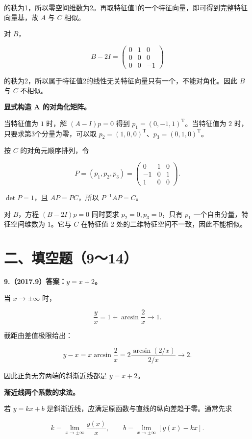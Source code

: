 \documentclass[UTF8,11pt,fontset=windows]{ctexart}
\begin{document}
的秩为1，所以零空间维数为2。再取特征值1的一个特征向量，即可得到完整特征向量基，故 $A$ 与 $C$ 相似。

对 $B$，

$$
B-2I=\begin{pmatrix}0&1&0\\0&0&0\\0&0&-1\end{pmatrix}
$$

的秩为2，所以属于特征值2的线性无关特征向量只有一个，不能对角化。因此 $B$ 与 $C$ 不相似。

\textbf{显式构造 A 的对角化矩阵。}

当特征值为 $1$ 时，解 $(A-I)p=0$ 得到 $p_1=(0,-1,1)^{\mathrm T}$。当特征值为 $2$ 时，只要求第3个分量为零，可以取 $p_2=(1,0,0)^{\mathrm T}$、$p_3=(0,1,0)^{\mathrm T}$。

按 $C$ 的对角元顺序排列，令

$$
P=(p_1,p_2,p_3)=\begin{pmatrix}0&1&0\\-1&0&1\\1&0&0\end{pmatrix}.
$$

$\det P=1$，且 $AP=PC$，所以 $P^{-1}AP=C$。

对 $B$，方程 $(B-2I)p=0$ 同时要求 $p_2=0,p_3=0$，只有 $p_1$ 一个自由分量，特征空间维数为 $1$。它与 $C$ 在特征值 $2$ 处的二维特征空间不一致，因此不能相似。

\clearpage

\section*{二、填空题（9～14）}

\textbf{9.（2017.9）答案：$y=x+2$。}

当 $x\to\pm\infty$ 时，

$$
\frac yx=1+\arcsin\frac2x\longrightarrow1.
$$

截距由差值极限给出：

$$
y-x=x\arcsin\frac2x
=2\frac{\arcsin(2/x)}{2/x}\longrightarrow2.
$$

因此正负无穷两端的斜渐近线都是 $y=x+2$。

\textbf{渐近线两个系数的求法。}

若 $y=kx+b$ 是斜渐近线，应满足原函数与直线的纵向差趋于零。通常先求

$$
k=\lim_{x\to\pm\infty}\frac{y(x)}x,
\qquad
b=\lim_{x\to\pm\infty}[y(x)-kx].
$$
\end{document}
